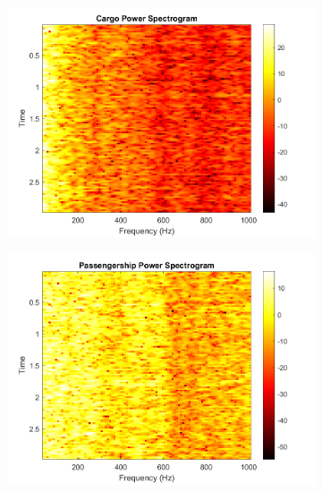 \begin{figure}[p]
    \centering
    \begin{subfigure}{0.49\textwidth}
        \centering
        \includegraphics[width=\linewidth]{img/ch3/power_spectrogram/Cargo.png} 
    \end{subfigure}
    \hfill
    \begin{subfigure}{0.49\textwidth}
        \centering
        \includegraphics[width=\linewidth]{img/ch3/power_spectrogram/Passengership.png} 
    \end{subfigure}

    \vspace{0.5cm} %


\end{figure}
